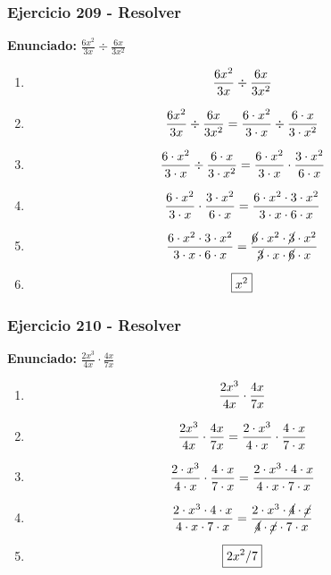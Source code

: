 \documentclass[11pt,a4paper]{article}
\newcommand{\fitmath}[1]{%
\[
\setbox0=\hbox{$\displaystyle #1$}%
\ifdim\wd0>\linewidth
\resizebox{\linewidth}{!}{$\displaystyle #1$}%
\else
#1%
\fi
\]
}
\begin{document}
\vspace{0.12cm}
\subsubsection*{Ejercicio 209 - Resolver}
\textbf{Enunciado:} $ \frac{6 x^{2}}{3 x} \div \frac{6 x}{3 x^{2}} $\par
\begin{enumerate}[leftmargin=2em]
\item \fitmath{\frac{6 x^{2}}{3 x} \div \frac{6 x}{3 x^{2}}}
\item \fitmath{\frac{6 x^{2}}{3 x} \div \frac{6 x}{3 x^{2}}= \frac{6\cdot x^{2}}{3\cdot x} \div \frac{6\cdot x}{3\cdot x^{2}}}
\item \fitmath{\frac{6\cdot x^{2}}{3\cdot x}\div \frac{6\cdot x}{3\cdot x^{2}}= \frac{6\cdot x^{2}}{3\cdot x}\cdot \frac{3\cdot x^{2}}{6\cdot x}}
\item \fitmath{\frac{6\cdot x^{2}}{3\cdot x}\cdot \frac{3\cdot x^{2}}{6\cdot x}= \frac{6\cdot x^{2}\cdot 3\cdot x^{2}}{3\cdot x\cdot 6\cdot x}}
\item \fitmath{\frac{6\cdot x^{2}\cdot 3\cdot x^{2}}{3\cdot x\cdot 6\cdot x}= \frac{\cancel{6}\cdot x^{2}\cdot \cancel{3}\cdot x^{2}}{\cancel{3}\cdot x\cdot \cancel{6}\cdot x}}
\item \fitmath{\boxed{x^{2}}}
\end{enumerate}

\vspace{0.12cm}
\subsubsection*{Ejercicio 210 - Resolver}
\textbf{Enunciado:} $ \frac{2 x^{3}}{4 x} \cdot \frac{4 x}{7 x} $\par
\begin{enumerate}[leftmargin=2em]
\item \fitmath{\frac{2 x^{3}}{4 x} \cdot \frac{4 x}{7 x}}
\item \fitmath{\frac{2 x^{3}}{4 x} \cdot \frac{4 x}{7 x}= \frac{2\cdot x^{3}}{4\cdot x} \cdot \frac{4\cdot x}{7\cdot x}}
\item \fitmath{\frac{2\cdot x^{3}}{4\cdot x}\cdot \frac{4\cdot x}{7\cdot x}= \frac{2\cdot x^{3}\cdot 4\cdot x}{4\cdot x\cdot 7\cdot x}}
\item \fitmath{\frac{2\cdot x^{3}\cdot 4\cdot x}{4\cdot x\cdot 7\cdot x}= \frac{2\cdot x^{3}\cdot \cancel{4}\cdot \cancel{x}}{\cancel{4}\cdot \cancel{x}\cdot 7\cdot x}}
\item \fitmath{\boxed{2 x^{2} / 7}}
\end{enumerate}
\end{document}
